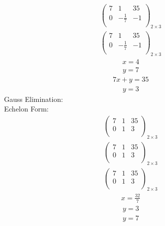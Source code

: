 \documentclass{article}
\begin{document}
\begin{align*}
\left(
\begin{array}{cc|c}
7 & 1 & 35\\
0 & -\frac{1}{7} & -1\\
\end{array}
\right)_{2\times 3}
\end{align*}
\begin{align*}
\left(
\begin{array}{cc|c}
7 & 1 & 35\\
0 & -\frac{1}{7} & -1\\
\end{array}
\right)_{2\times 3}
\end{align*}
\begin{align*}
x=4\end{align*}
\begin{align*}
y=7\end{align*}
\begin{align*}
7x + y=35\end{align*}
\begin{align*}
y=3\end{align*}
Gauss Elimination:\\
Echelon Form:\\
\begin{align*}
\left(
\begin{array}{cc|c}
7 & 1 & 35\\
0 & 1 & 3\\
\end{array}
\right)_{2\times 3}
\end{align*}
\begin{align*}
\left(
\begin{array}{cc|c}
7 & 1 & 35\\
0 & 1 & 3\\
\end{array}
\right)_{2\times 3}
\end{align*}
\begin{align*}
\left(
\begin{array}{cc|c}
7 & 1 & 35\\
0 & 1 & 3\\
\end{array}
\right)_{2\times 3}
\end{align*}
\begin{align*}
x=\frac{32}{7}\end{align*}
\begin{align*}
y=3\end{align*}
\begin{align*}
y=7\end{align*}
\end{document}
